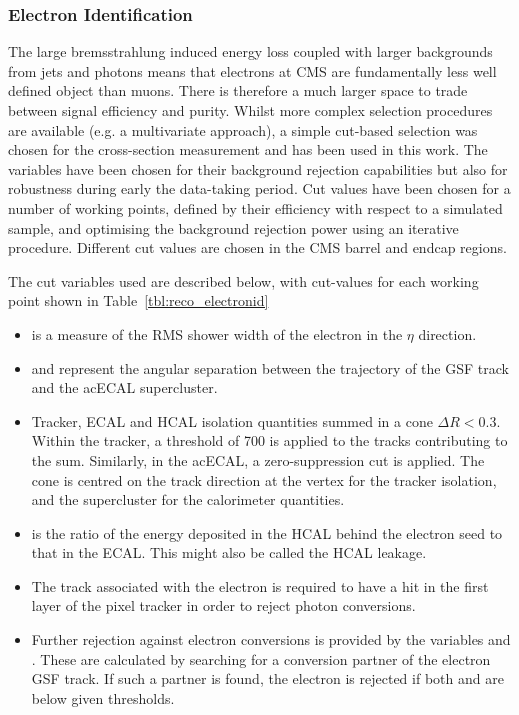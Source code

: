 \subsubsection{Electron Identification}
\label{sec:reco_electron_id}
The large bremsstrahlung induced energy loss coupled with larger backgrounds
from jets and photons means that electrons at \ac{CMS} are fundamentally less
well defined object than muons. There is therefore a much larger space to trade
between signal efficiency and purity. Whilst more complex selection procedures
are available (e.g. a multivariate approach), a simple cut-based selection was
chosen for the \PW cross-section measurement\cite{cms_pas_ewk_10_002} and has been
used in this work. The variables have been chosen for their background rejection
capabilities but also for robustness during early the data-taking period. Cut
values have been chosen for a number of working points, defined by their
efficiency with respect to a simulated \Wenu sample, and optimising the
background rejection power using an iterative procedure. Different cut values
are chosen in the \ac{CMS} barrel and endcap regions.

The cut variables used are described below, with cut-values for each working
point shown in Table~\ref{tbl:reco_electronid}
\begin{itemize}
\item \sigmaieta is a measure of the \ac{RMS} shower width of the electron
  in the $\eta$ direction.
\item \deltaphiin and \deltaetain represent the angular separation between the
  trajectory of the \ac{GSF} track and the ac{ECAL} supercluster.
\item Tracker, \ac{ECAL} and \ac{HCAL} isolation quantities summed in a cone
  $\Delta R < 0.3$. Within the tracker, a threshold of \unit{700}{\GeV} is
  applied to the tracks contributing to the sum. Similarly, in the ac{ECAL}, a
  zero-suppression cut is applied. The cone is centred on the track direction at
  the vertex for the tracker isolation, and the supercluster for the calorimeter
  quantities.
\item \HoverE is the ratio of the energy deposited in the \ac{HCAL} behind the
  electron seed to that in the \ac{ECAL}. This might also be called the
  \ac{HCAL} leakage.
\item The track associated with the electron is required to have a hit in the
  first layer of the pixel tracker in order to reject photon conversions.
\item Further rejection against electron conversions is provided by the
  variables \Dist and \DeltaCotTheta. These are calculated by searching for a
  conversion partner of the electron \ac{GSF} track. If such a partner is found,
  the electron is rejected if both \Dist and \DeltaCotTheta are below given thresholds.
\end{itemize}

